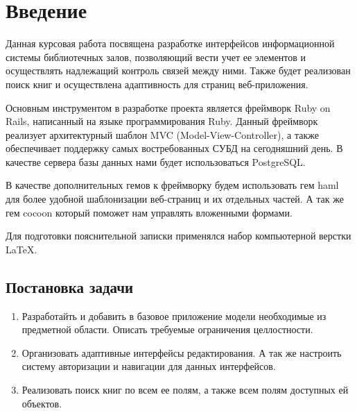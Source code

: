 \section{Введение}
Данная курсовая работа посвящена разработке интерфейсов информационной системы библиотечных залов,
позволяющий вести учет ее элементов и осуществлять надлежащий контроль связей между ними.
Также будет реализован поиск книг и осуществлена адаптивность для страниц веб-приложения.

Основным инструментом в разработке проекта является фреймворк Ruby on Rails,
написанный на языке программирования Ruby.
Данный фреймворк реализует архитектурный шаблон MVC (Model-View-Controller),
а также обеспечивает поддержку самых востребованных СУБД на сегодняшний день.
В качестве сервера базы данных нами будет использоваться PostgreSQL.

В качестве дополнительных гемов к фреймворку будем использовать гем haml для
более удобной шаблонизации веб-страниц и их отдельных частей. А так же гем
cocoon который поможет нам управлять вложенными формами.

Для подготовки пояснительной записки применялся набор компьютерной верстки \LaTeX.\

\subsection{Постановка задачи}

\begin{enumerate}
\item
Разработайть и добавить в базовое приложение модели необходимые из предметной области.
Описать требуемые ограничения целлостности.
\item
Организовать адаптивные интерфейсы редактирования. А так же настроить систему
авторизации и навигации для данных интерфейсов.
\item
Реализовать поиск книг по всем ее полям, а также всем полям доступных ей объектов.
\end{enumerate}
